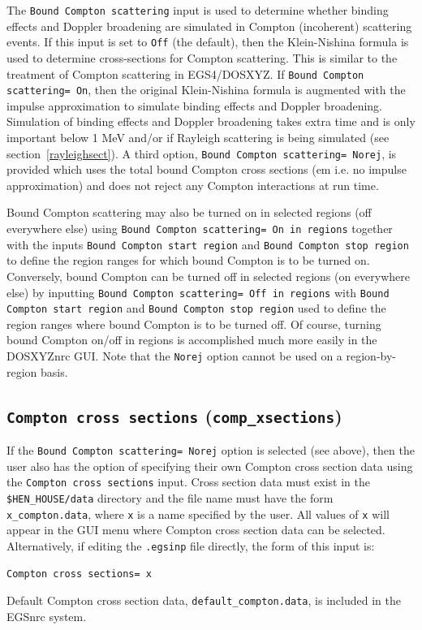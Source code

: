 \documentclass[12pt,twoside]{article}      %
\begin{document}
The {\tt Bound Compton scattering} input is used to determine whether binding effects
and Doppler broadening are simulated in Compton (incoherent) scattering
events.  If this input is set to {\tt Off} (the default), then the Klein-Nishina
formula\cite{KN29} is used to determine cross-sections for
Compton scattering.  This is similar to the treatment of Compton scattering
in EGS4/DOSXYZ.  If {\tt Bound Compton scattering= On}, then
the original Klein-Nishina formula is augmented with the
impulse approximation\cite{Ri75} to simulate binding effects and
Doppler broadening.  Simulation of binding effects and Doppler broadening takes
extra time and is only important below 1 MeV and/or if Rayleigh
scattering is being simulated (see section~\ref{rayleighsect}).
A third option, {\tt Bound Compton scattering= Norej}, is provided which
uses the total bound Compton cross sections ({em i.e.} no impulse
approximation) and does not reject any Compton interactions at run
time.

Bound Compton scattering may also be turned on in selected regions
(off everywhere else) using
{\tt  Bound Compton scattering= On in regions} together with
the inputs {\tt Bound Compton start region} and {\tt Bound Compton stop region}
to define the region ranges for which bound Compton is to be turned on.
Conversely, bound Compton can be turned off in selected regions
(on everywhere else) by inputting
{\tt  Bound Compton scattering= Off in regions} with
{\tt Bound Compton start region} and {\tt Bound Compton stop region} used
to define the region ranges where bound Compton is to be turned off.  Of
course, turning bound Compton on/off in regions is accomplished much more
easily in the DOSXYZnrc GUI.  Note that the {\tt Norej} option cannot be
used on a region-by-region basis.

\subsection{ {\tt Compton cross sections} ({\tt comp\_xsections})}

If the {\tt Bound Compton scattering= Norej} option is selected (see above), then
the user also has the option of
specifying their own Compton cross section data
using the {\tt Compton cross sections} input.  Cross section data must exist
in the {\tt \$HEN\_HOUSE/data} directory and the file name must have
the form {\tt x\_compton.data}, where {\tt x} is a name
specified by the user.  All values of {\tt x} will appear in the GUI menu where Compton
cross section data can be selected.  Alternatively, if editing
the {\tt .egsinp} file directly, the form of this input is:
\begin{verbatim}
Compton cross sections= x
\end{verbatim}
Default Compton cross section
data, {\tt default\_compton.data}, is included in
the EGSnrc system.
\end{document}
